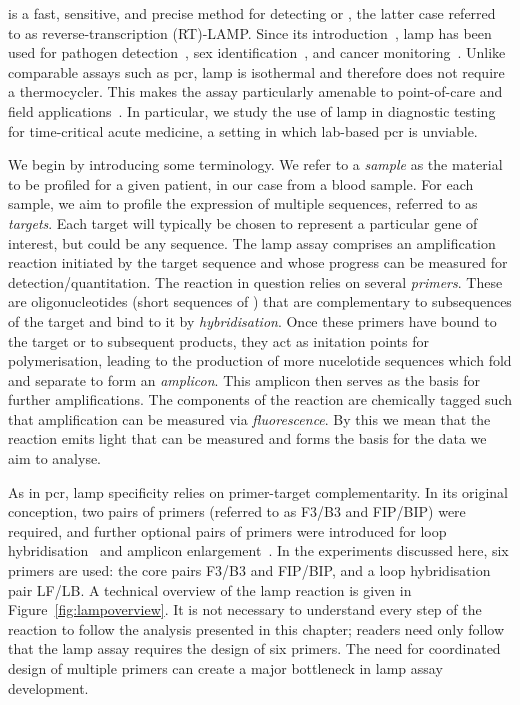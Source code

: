 \documentclass[../thesis.tex]{subfiles}
\begin{document}
 is a fast, sensitive, and precise method for detecting  or , the latter case referred to as reverse-transcription (RT)-LAMP. Since its introduction~\citep{notomi_loop-mediated_2000}, \gls{lamp} has been used for pathogen detection~\citep{mekata_real-time_2009, cao_development_2017, thiessen_development_2018}, sex identification~\citep{hirayama_embryo_2013, almasi_loop_2017, centeno-cuadros_validation_2018}, and cancer monitoring~\citep{li_loop-mediated_2016, horiuchi_novel_2020, kalofonou_novel_2020}. 
Unlike comparable assays such as \gls{pcr}, \gls{lamp} is isothermal and therefore does not require a thermocycler. This makes the assay particularly amenable to point-of-care and field applications~\citep{fu_applications_2011}. In particular, we study the use of \gls{lamp} in diagnostic testing for time-critical acute medicine, a setting in which lab-based \gls{pcr} is unviable.

We begin by introducing some terminology. We refer to a \emph{sample} as the material to be profiled for a given patient, in our case from a blood sample. For each sample, we aim to profile the expression of multiple  sequences, referred to as \emph{targets}.  Each target will typically be chosen to represent a particular gene of interest, but could be any sequence. The \gls{lamp} assay comprises an amplification reaction initiated by the target sequence and whose progress can be measured for detection/quantitation. The reaction in question relies on several \emph{primers}. These are oligonucleotides (short sequences of ) that are complementary to subsequences of the target and bind to it by \emph{hybridisation}. Once these primers have bound to the target or to subsequent products, they act as initation points for polymerisation, leading to the production of more nucelotide sequences which fold and separate to form an \emph{amplicon}. This amplicon then serves as the basis for further amplifications. The components of the reaction are chemically tagged such that amplification can be measured via \emph{fluorescence}. By this we mean that the reaction emits light that can be measured and forms the basis for the data we aim to analyse.

As in \gls{pcr}, \gls{lamp} specificity relies on primer-target complementarity. In its original conception, two pairs of primers (referred to as F3/B3 and FIP/BIP) were required, and further optional pairs of primers were introduced for loop hybridisation~\citep{nagamine_accelerated_2002} and amplicon enlargement~\citep{gandelman_loop-mediated_2011}. In the experiments discussed here, six primers are used: the core pairs F3/B3 and FIP/BIP, and a loop hybridisation pair LF/LB.  A technical overview of the \gls{lamp} reaction is given in Figure~\ref{fig:lampoverview}. It is not necessary to understand every step of the reaction to follow the analysis presented in this chapter; readers need only follow that the \gls{lamp} assay requires the design of six primers. The need for coordinated design of multiple primers can create a major bottleneck in \gls{lamp} assay development.
\end{document}
